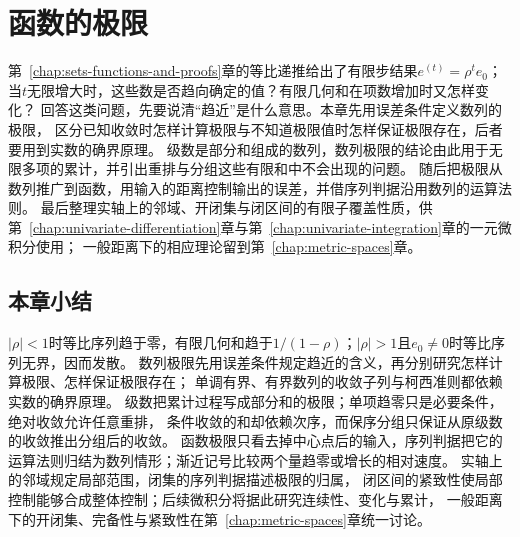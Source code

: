 \chapter{函数的极限}
\label{chap:function-limits}
\label{chap:mathematical-analysis}

第~\ref{chap:sets-functions-and-proofs}章的等比递推给出了有限步结果$e^{(t)}=\rho^te_0$；
当$t$无限增大时，这些数是否趋向确定的值？有限几何和在项数增加时又怎样变化？
回答这类问题，先要说清“趋近”是什么意思。本章先用误差条件定义数列的极限，
区分已知收敛时怎样计算极限与不知道极限值时怎样保证极限存在，后者要用到实数的确界原理。
级数是部分和组成的数列，数列极限的结论由此用于无限多项的累计，并引出重排与分组这些有限和中不会出现的问题。
随后把极限从数列推广到函数，用输入的距离控制输出的误差，并借序列判据沿用数列的运算法则。
最后整理实轴上的邻域、开闭集与闭区间的有限子覆盖性质，供第~\ref{chap:univariate-differentiation}章与第~\ref{chap:univariate-integration}章的一元微积分使用；
一般距离下的相应理论留到第~\ref{chap:metric-spaces}章。




\FloatBarrier
\section{本章小结}
\label{sec:function-limits-summary}

$|\rho|<1$时等比序列趋于零，有限几何和趋于$1/(1-\rho)$；$|\rho|>1$且$e_0\neq0$时等比序列无界，因而发散。
数列极限先用误差条件规定趋近的含义，再分别研究怎样计算极限、怎样保证极限存在；
单调有界、有界数列的收敛子列与柯西准则都依赖实数的确界原理。
级数把累计过程写成部分和的极限；单项趋零只是必要条件，绝对收敛允许任意重排，
条件收敛的和却依赖次序，而保序分组只保证从原级数的收敛推出分组后的收敛。
函数极限只看去掉中心点后的输入，序列判据把它的运算法则归结为数列情形；渐近记号比较两个量趋零或增长的相对速度。
实轴上的邻域规定局部范围，闭集的序列判据描述极限的归属，
闭区间的紧致性使局部控制能够合成整体控制；后续微积分将据此研究连续性、变化与累计，
一般距离下的开闭集、完备性与紧致性在第~\ref{chap:metric-spaces}章统一讨论。
